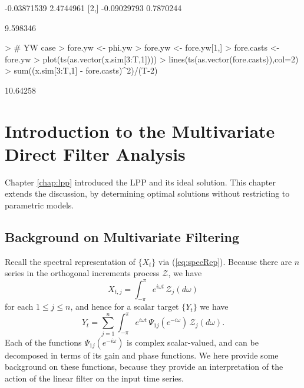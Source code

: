\documentclass[a4paper]{book}
\begin{document}
\begin{Schunk}
\begin{Soutput}
            [,1]      [,2]
[1,] -0.03871539 2.4744961
[2,] -0.09029793 0.7870244
\end{Soutput}
\begin{Soutput}
[1] 9.598346
\end{Soutput}
\begin{Sinput}
> # YW case
> fore.yw <- phi.yw %
> fore.yw <- fore.yw[1,]
> fore.casts <- fore.yw %
> plot(ts(as.vector(x.sim[3:T,1])))
> lines(ts(as.vector(fore.casts)),col=2)
> sum((x.sim[3:T,1] - fore.casts)^2)/(T-2)
\end{Sinput}
\begin{Soutput}
[1] 10.64258
\end{Soutput}
\end{Schunk}





\chapter{Introduction to the Multivariate Direct Filter Analysis}
\label{chap:basic}

Chapter \ref{chap:lpp} introduced the LPP and its ideal solution.  This chapter
 extends the discussion, by determining optimal solutions without restricting
 to parametric models.

\section{Background on Multivariate Filtering}

 Recall the spectral representation of $\{ X_t \}$ via (\ref{eq:specRep}).  Because 
 there are $n$ series in the orthogonal increments process $\mathcal{Z}$, we have
\[
  X_{t,j} = \int_{-\pi}^{\pi} e^{i \omega t} \, \mathcal{Z}_j (d\omega )
\] 
 for each $1 \leq j \leq n$, and hence for a scalar target $\{ Y_t \}$ we have
\begin{equation}
 \label{eq:spec-rep.partial}
  Y_t = \sum_{j=1}^n  \int_{-\pi}^{\pi} e^{i \omega  t} \, \Psi_{1 j} (e^{-i \omega }) \,
   \mathcal{Z}_j (d\omega ).
\end{equation}
  Each of the functions $\Psi_{1j} (e^{-i \omega })$ is complex scalar-valued, and
 can be decomposed in terms of its gain and phase functions.   We here provide some
 background on these functions, because they provide an interpretation of the action
 of the linear filter on the input time series.
\end{document}

